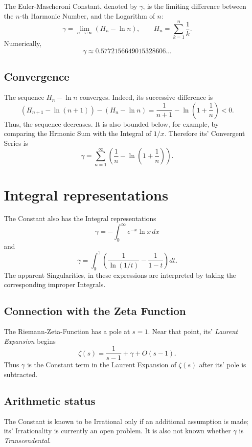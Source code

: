 \documentclass[a4paper, 10pt, onepage]{elegantbook}
\begin{document}
{The Euler-Mascheroni Constant, denoted by \(\gamma\), is the limiting difference between the \(n\)-th Harmonic Number, 
and the  Logarithm of \(n\):
\[
\boxed{
\gamma=\lim_{n\to\infty}\left(H_n-\ln n\right)
},
\qquad
H_n=\sum_{k=1}^{n}\frac{1}{k}.
\]
Numerically,
\[
\gamma\approx 0.5772156649015328606\ldots
\]

\subsection{Convergence}

The sequence \(H_n-\ln n\) converges. Indeed, its successive difference is
\[
(H_{n+1}-\ln(n+1))-(H_n-\ln n)
=
\frac{1}{n+1}-\ln\left(1+\frac{1}{n}\right)<0.
\]
Thus, the sequence decreases. It is also bounded below, for example, by comparing the Hrmonic Sum with the Integral of 
\(1/x\). Therefore its' Convergent Series is
\[
\gamma
=
\sum_{n=1}^{\infty}
\left(
\frac{1}{n}-\ln\left(1+\frac{1}{n}\right)
\right).
\]

\section{Integral representations}

The Constant also has the Integral representations
\[
\gamma
=-\int_0^\infty e^{-x}\ln x\,dx
\]
and
\[
\gamma
=\int_0^1
\left(
\frac{1}{\ln(1/t)}-\frac{1}{1-t}
\right)dt.
\]
The apparent Singularities, in these expressions are interpreted by taking the corresponding improper Integrals.

\subsection{Connection with the Zeta Function}

The Riemann-Zeta-Function has a pole at \(s=1\). Near that point, its' \emph{Laurent Expansion} begins
\[
\zeta(s)
=
\frac{1}{s-1}+\gamma+O(s-1).
\]
Thus \(\gamma\) is the Constant term in the Laurent Expansion of \(\zeta(s)\) after its' pole is subtracted.

\subsection{Arithmetic status}

The Constant is known to be Irrational only if an additional assumption is made; its' Irrationality is currently an 
open problem. It is also not known whether \(\gamma\) is \emph{Transcendental}.

}
\end{document}
